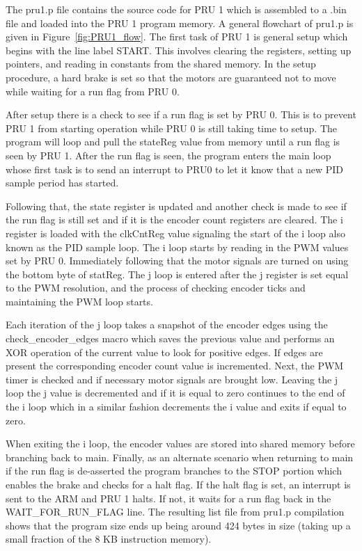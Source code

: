 \documentclass[12pt,oneside,final]{siuethesis}
\theoremstyle{definition}
\begin{document}
The pru1.p file contains the source code for PRU 1 which is assembled to a .bin file and loaded into the PRU 1 program memory. A general flowchart of pru1.p is given in Figure~\ref{fig:PRU1_flow}. The first task of PRU 1 is general setup which begins with the line label START. This involves clearing the registers, setting up pointers, and reading in constants from the shared memory. In the setup procedure, a hard brake is set so that the motors are guaranteed not to move while waiting for a run flag from PRU 0. 

After setup there is a check to see if a run flag is set by PRU 0. This is to prevent PRU 1 from starting operation while PRU 0 is still taking time to setup. The program will loop and pull the stateReg value from memory until a run flag is seen by PRU 1. After the run flag is seen, the program enters the main loop whose first task is to send an interrupt to PRU0 to let it know that a new PID sample period has started. 

Following that, the state register is updated and another check is made to see if the run flag is still set and if it is the encoder count registers are cleared.  The i register is loaded with the clkCntReg value signaling the start of the i loop also known as the PID sample loop. The i loop starts by reading in the PWM values set by PRU 0. Immediately following that the motor signals are turned on using the bottom byte of statReg. The j loop is entered after the j register is set equal to the PWM resolution, and the process of checking encoder ticks and maintaining the PWM loop starts. 

Each iteration of the j loop takes a snapshot of the encoder edges using the \\
check\_encoder\_edges macro which saves the previous value and performs an XOR operation of the current value to look for positive edges. If edges are present the corresponding encoder count value is incremented. Next, the PWM timer is checked and if necessary motor signals are brought low. Leaving the j loop the j value is decremented and if it is equal to zero continues to the end of the i loop which in a similar fashion decrements the i value and exits if equal to zero.

When exiting the i loop, the encoder values are stored into shared memory before branching back to main. Finally, as an alternate scenario when returning to main if the run flag is de-asserted the program branches to the STOP portion which enables the brake and checks for a halt flag. If the halt flag is set, an interrupt is sent to the ARM and PRU 1 halts. If not, it waits for a run flag back in the WAIT\_FOR\_RUN\_FLAG line. The resulting list file from pru1.p compilation shows that the program size ends up being around 424 bytes in size (taking up a small fraction of the 8 KB instruction memory).
\end{document}
